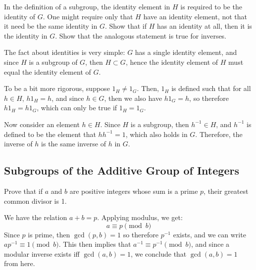 \documentclass[10pt]{article}
\begin{document}
\begin{problem}
	In the definition of a subgroup, the identity element in \( H \) is required 
	to be the identity of \( G \). One might require only that \( H \) have an identity 
	element, not that it need be the same identity in \( G \). Show that 
	if \( H \) has an identity at all, then it is the identity in \( G \). 
	Show that the analogous statement is true for inverses. 
\end{problem}

\begin{solution}
	The fact about identities is very simple: \( G \) has a single identity 
	element, and since \( H \) is a subgroup of \( G \), then \( H \subset G \), 
	hence the identity element of \( H \) must equal the identity element of \( G \).  

	To be a bit more rigorous, suppose \( 1_H \neq 1_G\). Then, \( 1_H \) is defined 
	such that for all \( h \in H \), \( h 1_H = h \), and since \( h \in G\), then 
	we also have \( h 1_G = h \), so therefore \( h 1_H = h 1_G \), which can 
	only be true if \( 1_H = 1_G \). 

	Now consider an element \( h \in H \). Since \( H \) is a subgroup, then 
	\( h^{-1} \in H \), and \( h^{-1} \) is defined to be the element 
	that \( hh^{-1} = 1 \), which also holds in \( G \). Therefore, 
	the inverse of \( h \) is the same inverse of \( h \) in \( G \).
\end{solution}

\subsection{Subgroups of the Additive Group of Integers}
\begin{problem}
	Prove that if \( a \) and \( b \) are positive integers whose sum is a prime 
	\( p \), their greatest common divisor is 1. 
\end{problem}

\begin{solution}
	We have the relation \( a + b = p \). Applying modulus, we get:
	\[
		a \equiv p \pmod b
	\] 
	Since \( p \) is prime, then \( \gcd(p, b) = 1 \) so therefore \( p^{-1} \)
	exists, and we can write \( ap ^{-1} \equiv 1 \pmod b \). This then 
	implies that \( a^{-1} \equiv p^{-1} \pmod b \), and since a modular inverse 
	exists iff \( \gcd(a, b) = 1 \), we conclude that \( \gcd(a, b) = 1 \) from 
	here. 
\end{solution}
\end{document}
